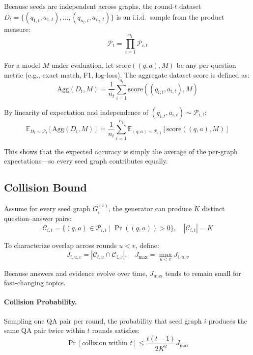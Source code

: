 Because seeds are independent across graphs, the round-$t$ dataset 
$D_t = \{ (q_{1,t}, a_{1,t}), \ldots, (q_{n_t,t}, a_{n_t,t}) \}$ 
is an i.i.d.\ sample from the product measure:
\begin{equation}
    \mathcal{P}_t = \prod_{i=1}^{n_t} \mathcal{P}_{i,t}
\end{equation}

For a model $M$ under evaluation, let $\text{score}((q, a), M)$ be any per-question metric (e.g., exact match, F1, log-loss). The aggregate dataset score is defined as:
\begin{equation}
    \text{Agg}(D_t, M) = \frac{1}{n_t} \sum_{i=1}^{n_t} \text{score}((q_{i,t}, a_{i,t}), M)
\end{equation}

By linearity of expectation and independence of $(q_{i,t}, a_{i,t}) \sim \mathcal{P}_{i,t}$:
\begin{equation}
    \mathbb{E}_{D_t \sim \mathcal{P}_t}[\text{Agg}(D_t, M)] 
    = \frac{1}{n_t} \sum_{i=1}^{n_t} \mathbb{E}_{(q,a) \sim \mathcal{P}_{i,t}}[\text{score}((q,a), M)]
\end{equation}

This shows that the expected accuracy is simply the average of the per-graph expectations—so every seed graph contributes equally.

\subsection{Collision Bound}

Assume for every seed graph $G_i^{(t)}$, the generator can produce $K$ distinct question–answer pairs:
\[
\mathcal{C}_{i,t} = \{ (q, a) \in \mathcal{P}_{i,t} \mid \Pr((q, a)) > 0 \}, \quad |\mathcal{C}_{i,t}| = K
\]

To characterize overlap across rounds $u < v$, define:
\[
J_{i,u,v} = |\mathcal{C}_{i,u} \cap \mathcal{C}_{i,v}|, \quad J_{\max} = \max_{u < v} J_{i,u,v}
\]

Because answers and evidence evolve over time, $J_{\max}$ tends to remain small for fast-changing topics.

\paragraph{Collision Probability.} Sampling one QA pair per round, the probability that seed graph $i$ produces the same QA pair twice within $t$ rounds satisfies:
\begin{equation}
    \Pr[\text{collision within } t] \leq \frac{t(t-1)}{2K^2} J_{\max}
\end{equation}

